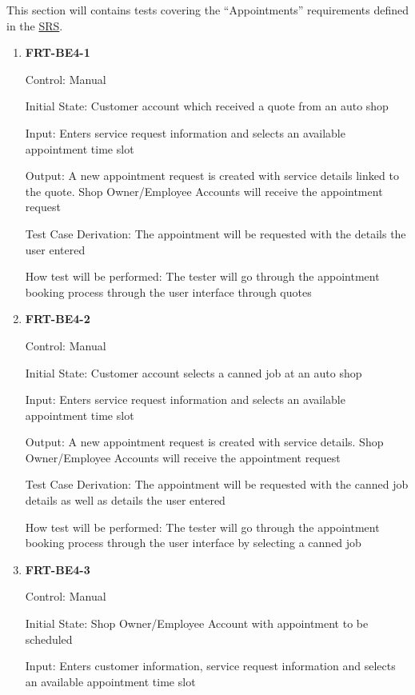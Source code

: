 \documentclass[12pt, titlepage]{article}
\begin{document}
This section will contains tests covering the ``Appointments'' requirements defined in the
\href{https://github.com/arkinmodi/project-sayyara/blob/main/docs/SRS/SRS.pdf}{SRS}.

\begin{enumerate}

	\item \textbf{FRT-BE4-1}

	      Control: Manual

	      Initial State: Customer account which received a quote from an auto shop

	      Input: Enters service request information and selects an available appointment time slot

	      Output: A new appointment request is created with service details linked to the quote. Shop
	      Owner/Employee Accounts will receive the appointment request

	      Test Case Derivation: The appointment will be requested with the details the user entered

	      How test will be performed: The tester will go through the appointment booking process through the
	      user interface through quotes

	\item \textbf{FRT-BE4-2}

	      Control: Manual

	      Initial State: Customer account selects a canned job at an auto shop

	      Input: Enters service request information and selects an available appointment time slot

	      Output: A new appointment request is created with service details. Shop Owner/Employee Accounts
	      will receive the appointment request

	      Test Case Derivation: The appointment will be requested with the canned job details as well as
	      details the user entered

	      How test will be performed: The tester will go through the appointment booking process through the
	      user interface by selecting a canned job

	\item \textbf{FRT-BE4-3}

	      Control: Manual

	      Initial State: Shop Owner/Employee Account with appointment to be scheduled

	      Input: Enters customer information, service request information and selects an available
	      appointment time slot


\end{enumerate}
\end{document}
